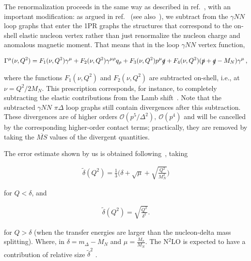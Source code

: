 \documentclass[prc,twocolumn,showpacs,preprintnumbers,amsmath,amssymb
,superscriptaddress,a4paper,nofootinbib
]{revtex4-1}
\begin{document}
The renormalization proceeds in the same way as described in ref.~\cite{Lensky:2009uv}, with an important modification: as argued in
ref.~\cite{Birse:2012eb} (see also~\cite{Alarcon:2013cba}), we subtract from the $\gamma NN$ loop graphs that enter the 1PR graphs
the structures that correspond to the on-shell elastic nucleon vertex rather than just renormalize the nucleon charge and anomalous magnetic moment.
That means that in the loop $\gamma NN$ vertex function,
\begin{widetext}
\begin{equation}
\Gamma^\mu(\nu,Q^2)=F_1(\nu,Q^2)\gamma^\mu+F_2(\nu,Q^2)\gamma^{\mu\rho}q_\rho+F_3(\nu,Q^2)p^\mu\slashed{q}+F_4(\nu,Q^2)(\slashed{p}+\slashed{q}-M_N)\gamma^\mu\,,
\end{equation}
\end{widetext}
where the functions $F_1(\nu,Q^2)$ and $F_2(\nu,Q^2)$ are subtracted on-shell, i.e., at $\nu=Q^2/2M_N$. This prescription corresponds, for instance,
to completely subtracting the elastic contributions from the Lamb shift~\cite{Alarcon:2013cba}. Note that the subtracted $\gamma NN$ $\pi \Delta$ loop graphs
still contain divergences after this subtraction. These divergences are of higher orders $\mathcal{O}(p^5/\varDelta^2),\ \mathcal{O}(p^4)$
and will be cancelled by the corresponding higher-order
contact terms; practically, they are removed by taking the $\overline{MS}$ values of the divergent quantities.

The error estimate shown by us is obtained following~\cite{Pascalutsa:2005vq}, taking

\begin{align}
  \tilde{\delta}(Q^2) = \frac{1}{3} \Big(\delta +\sqrt{\mu} + \sqrt{\frac{Q^2}{M_N^2}}\Big)
\end{align}

for $Q< \delta$, and

\begin{align}
  \tilde{\delta}(Q^2) = \sqrt{\frac{Q^2}{\delta^2}}.
\end{align}

for $Q>\delta$ (when the transfer energies are larger than the nucleon-delta mass splitting).
Where, in $\delta = m_\Delta - M_N$ and $\mu = \frac{M_\pi}{M_N}$.
The N$^2$LO is expected to have a contribution of relative size $\tilde{\delta}^2$ \cite{Pascalutsa:2005vq}.

\end{document}

